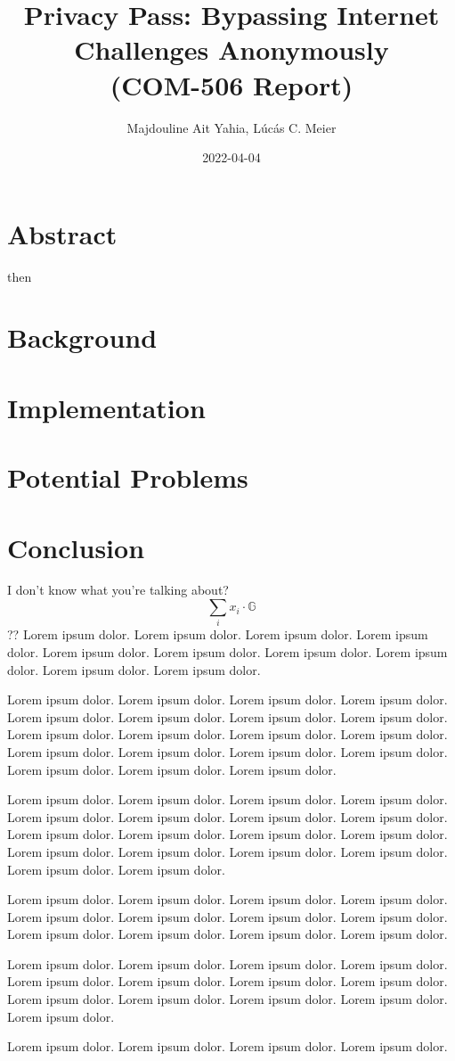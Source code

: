 \documentclass[10pt, a4paper]{article}
\date{2022-04-04}
\title{Privacy Pass: Bypassing Internet Challenges Anonymously\\
\large (COM-506 Report)
}
\author{Majdouline Ait Yahia, Lúcás C. Meier}
\begin{document}
\maketitle

\section*{Abstract}
\cite{maurer_2009} then \cite{davidson_privacy_2018}

\section{Background}
\section{Implementation}
\section{Potential Problems}
\section{Conclusion}

I don't know what you're talking about?
$$
\sum_i x_i \cdot \mathbb{G}
$$
??
Lorem ipsum dolor.
Lorem ipsum dolor.
Lorem ipsum dolor.
Lorem ipsum dolor.
Lorem ipsum dolor.
Lorem ipsum dolor.
Lorem ipsum dolor.
Lorem ipsum dolor.
Lorem ipsum dolor.
Lorem ipsum dolor.

Lorem ipsum dolor.
Lorem ipsum dolor.
Lorem ipsum dolor.
Lorem ipsum dolor.
Lorem ipsum dolor.
Lorem ipsum dolor.
Lorem ipsum dolor.
Lorem ipsum dolor.
Lorem ipsum dolor.
Lorem ipsum dolor.
Lorem ipsum dolor.
Lorem ipsum dolor.
Lorem ipsum dolor.
Lorem ipsum dolor.
Lorem ipsum dolor.
Lorem ipsum dolor.
Lorem ipsum dolor.
Lorem ipsum dolor.
Lorem ipsum dolor.

Lorem ipsum dolor.
Lorem ipsum dolor.
Lorem ipsum dolor.
Lorem ipsum dolor.
Lorem ipsum dolor.
Lorem ipsum dolor.
Lorem ipsum dolor.
Lorem ipsum dolor.
Lorem ipsum dolor.
Lorem ipsum dolor.
Lorem ipsum dolor.
Lorem ipsum dolor.
Lorem ipsum dolor.
Lorem ipsum dolor.
Lorem ipsum dolor.
Lorem ipsum dolor.
Lorem ipsum dolor.
Lorem ipsum dolor.

Lorem ipsum dolor.
Lorem ipsum dolor.
Lorem ipsum dolor.
Lorem ipsum dolor.
Lorem ipsum dolor.
Lorem ipsum dolor.
Lorem ipsum dolor.
Lorem ipsum dolor.
Lorem ipsum dolor.
Lorem ipsum dolor.
Lorem ipsum dolor.
Lorem ipsum dolor.

Lorem ipsum dolor.
Lorem ipsum dolor.
Lorem ipsum dolor.
Lorem ipsum dolor.
Lorem ipsum dolor.
Lorem ipsum dolor.
Lorem ipsum dolor.
Lorem ipsum dolor.
Lorem ipsum dolor.
Lorem ipsum dolor.
Lorem ipsum dolor.
Lorem ipsum dolor.
Lorem ipsum dolor.

Lorem ipsum dolor.
Lorem ipsum dolor.
Lorem ipsum dolor.
Lorem ipsum dolor.


\footnotesize 
\end{document}
